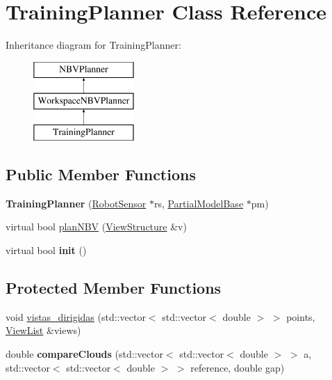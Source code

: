 \hypertarget{classTrainingPlanner}{}\section{Training\+Planner Class Reference}
\label{classTrainingPlanner}
Inheritance diagram for Training\+Planner\+:\begin{figure}[H]
\begin{center}
\leavevmode
\includegraphics[height=3.000000cm]{classTrainingPlanner}
\end{center}
\end{figure}
\subsection*{Public Member Functions}
\begin{DoxyCompactItemize}
\item 
{\bfseries Training\+Planner} (\hyperlink{classRobotSensor}{Robot\+Sensor} $\ast$rs, \hyperlink{classPartialModelBase}{Partial\+Model\+Base} $\ast$pm)\hypertarget{classTrainingPlanner_a13661b6d725724922f92e92b0fa90ad7}{}\label{classTrainingPlanner_a13661b6d725724922f92e92b0fa90ad7}

\item 
virtual bool \hyperlink{classTrainingPlanner_a9c82d194af01b8edf4d34a34e36c4c8c}{plan\+N\+BV} (\hyperlink{classViewStructure}{View\+Structure} \&v)
\item 
virtual bool {\bfseries init} ()\hypertarget{classTrainingPlanner_a91db3bbe0754d25516b7cece39c16bb7}{}\label{classTrainingPlanner_a91db3bbe0754d25516b7cece39c16bb7}

\end{DoxyCompactItemize}
\subsection*{Protected Member Functions}
\begin{DoxyCompactItemize}
\item 
void \hyperlink{classTrainingPlanner_a9e7e795c15199a3fd508de2c28b6e995}{vistas\+\_\+dirigidas} (std\+::vector$<$ std\+::vector$<$ double $>$ $>$ points, \hyperlink{classViewList}{View\+List} \&views)
\item 
double {\bfseries compare\+Clouds} (std\+::vector$<$ std\+::vector$<$ double $>$ $>$ a, std\+::vector$<$ std\+::vector$<$ double $>$ $>$ reference, double gap)\hypertarget{classTrainingPlanner_a7b9e54357833ef501fbf03fbfd9bc74d}{}\label{classTrainingPlanner_a7b9e54357833ef501fbf03fbfd9bc74d}

\end{DoxyCompactItemize}
